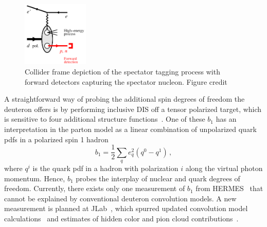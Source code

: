     \begin{figure}
        \includegraphics[width=0.28\textwidth]{plots/deut_tag_collider}
        \caption{Collider frame depiction of the spectator tagging process with forward detectors capturing the spectator nucleon. Figure credit~\cite{LDRD}}
        \label{fig:collider}
    \end{figure}

A straightforward way of probing the additional spin degrees of freedom the deuteron offers is by performing inclusive DIS off a tensor polarized target, which is sensitive to four additional structure functions~\cite{Hoodbhoy:1988am}.  One of these $b_1$ has an interpretation in the parton model as a linear combination of unpolarized quark pdfs in a polarized spin 1 hadron
\begin{equation}
b_1=\frac{1}{2}\sum_q e_q^2(q^0-q^1)\,,
\end{equation}
where $q^i$ is the quark pdf in a hadron with polarization $i$ along the virtual photon momentum.  Hence, $b_1$ probes the interplay of nuclear and quark degrees of freedom.  Currently, there exists only one measurement of $b_1$ from HERMES~\cite{Airapetian:2005cb} that cannot be explained by conventional deuteron convolution models.  A new measurement is planned at JLab~\cite{Slifer:2013vma}, which spurred updated convolution model calculations~\cite{Cosyn:2017fbo} and estimates of hidden color and pion cloud contributions~\cite{Miller:2013hla}.
